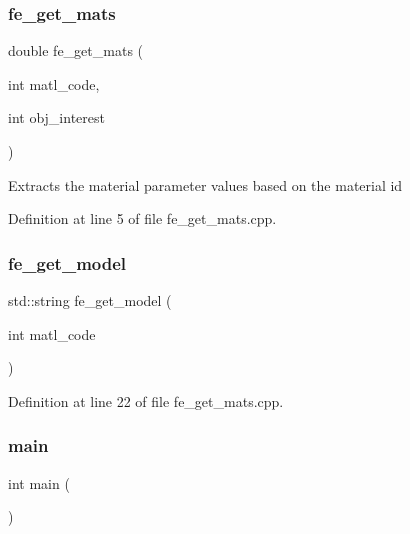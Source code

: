 \subsubsection{\texorpdfstring{fe\+\_\+get\+\_\+mats}{fe\_get\_mats}}
{\footnotesize\ttfamily double fe\+\_\+get\+\_\+mats (\begin{DoxyParamCaption}\item[{int}]{matl\+\_\+code,  }\item[{int}]{obj\+\_\+interest }\end{DoxyParamCaption})\hspace{0.3cm}{\ttfamily [friend]}}

Extracts the material parameter values based on the material id 

Definition at line 5 of file fe\+\_\+get\+\_\+mats.\+cpp.

\mbox{\label{class_materials_a34d6fb85943d945b7e8600d2ef4220d0}} 
\subsubsection{\texorpdfstring{fe\+\_\+get\+\_\+model}{fe\_get\_model}}
{\footnotesize\ttfamily std\+::string fe\+\_\+get\+\_\+model (\begin{DoxyParamCaption}\item[{int}]{matl\+\_\+code }\end{DoxyParamCaption})\hspace{0.3cm}{\ttfamily [friend]}}



Definition at line 22 of file fe\+\_\+get\+\_\+mats.\+cpp.

\mbox{\label{class_materials_ae66f6b31b5ad750f1fe042a706a4e3d4}} 
\subsubsection{\texorpdfstring{main}{main}}
{\footnotesize\ttfamily int main (\begin{DoxyParamCaption}{ }\end{DoxyParamCaption})\hspace{0.3cm}{\ttfamily [friend]}}

